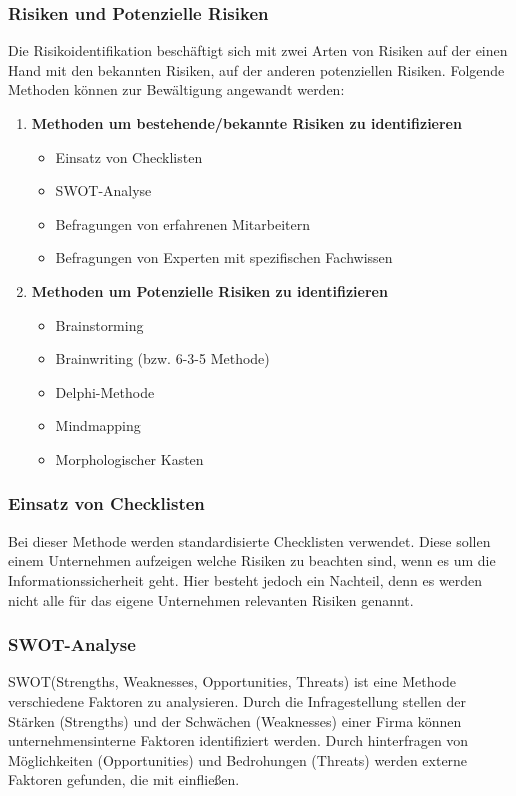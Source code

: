 \subsubsection{Risiken und Potenzielle Risiken}
Die Risikoidentifikation beschäftigt sich mit zwei Arten von Risiken auf der einen Hand mit den bekannten Risiken, auf der anderen potenziellen Risiken. Folgende Methoden können zur Bewältigung angewandt werden:
\begin{enumerate}
    \item \textbf{Methoden um bestehende/bekannte Risiken zu identifizieren}
    \begin{itemize}
        \item Einsatz von Checklisten
        \item SWOT-Analyse
        \item Befragungen von erfahrenen Mitarbeitern
        \item Befragungen von Experten mit spezifischen Fachwissen
    \end{itemize}
    \item \textbf{Methoden um Potenzielle Risiken zu identifizieren}
    \begin{itemize}
    	\item Brainstorming
    	\item Brainwriting (bzw. 6-3-5 Methode)
    	\item Delphi-Methode
    	\item Mindmapping
    	\item Morphologischer Kasten
    \end{itemize}
\end{enumerate}

\subsubsection{Einsatz von Checklisten}
Bei dieser Methode werden standardisierte Checklisten verwendet. Diese sollen einem Unternehmen aufzeigen welche Risiken zu beachten sind, wenn es um die Informationssicherheit geht. Hier besteht jedoch ein Nachteil, denn es werden nicht alle für das eigene Unternehmen relevanten Risiken genannt.

\subsubsection{SWOT-Analyse}
SWOT(Strengths, Weaknesses, Opportunities, Threats) ist eine Methode verschiedene Faktoren zu analysieren. 
Durch die Infragestellung stellen der Stärken (Strengths) und der Schwächen (Weaknesses) einer Firma können unternehmensinterne Faktoren identifiziert werden.
Durch hinterfragen von Möglichkeiten (Opportunities) und Bedrohungen (Threats) werden externe Faktoren gefunden, die mit einfließen.


